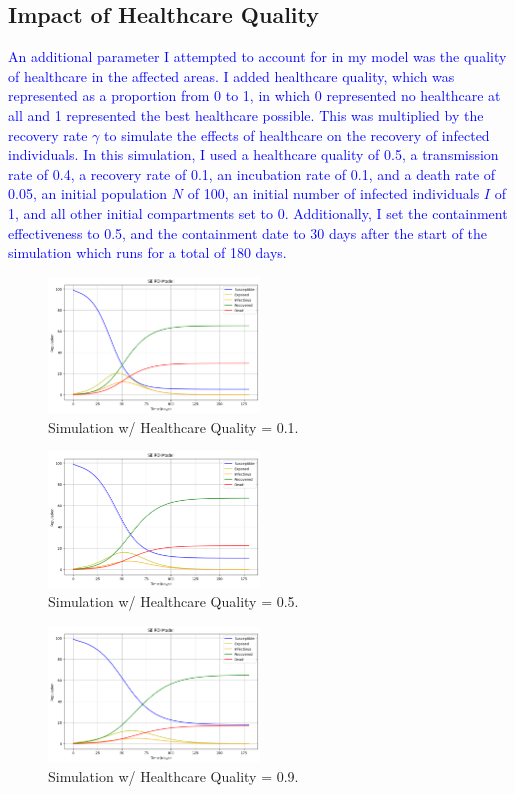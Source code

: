 \documentclass[%
 reprint,
superscriptaddress,
 amsmath,amssymb,
 aps,
floatfix,
]{revtex4-2}
\begin{document}
\subsection{Impact of Healthcare Quality}
\textcolor{blue}{
    An additional parameter I attempted to account for in my model was the quality of healthcare in the affected areas. 
    I added healthcare quality, which was represented as a proportion from 0 to 1, in which 0 represented no healthcare at all and 1 represented the best healthcare possible. 
    This was multiplied by the recovery rate $\gamma$ to simulate the effects of healthcare on the recovery of infected individuals.
    In this simulation, I used a 
    healthcare quality of 0.5, 
    a transmission rate of 0.4,
    a recovery rate of 0.1, 
    an incubation rate of 0.1, 
    and a death rate of 0.05, 
    an initial population $N$ of 100,
    an initial number of infected individuals $I$ of 1, 
    and all other initial compartments set to 0. 
    Additionally, I set the containment effectiveness to 0.5, 
    and the containment date to 30 days after the start of the simulation which runs for a total of 180 days. }
\begin{figure}[hbt!]
    \centering
    \includegraphics[width=0.5\textwidth]{HealthCareA.png}
    \caption{Simulation w/ Healthcare Quality = 0.1.}
    \label{HealthcareA}
\end{figure}
\begin{figure}[hbt!]
    \centering
    \includegraphics[width=0.5\textwidth]{HealthCareB.png}
    \caption{Simulation w/ Healthcare Quality = 0.5.}
    \label{HealthcareB}
\end{figure}
\begin{figure}[hbt!]
    \centering
    \includegraphics[width=0.5\textwidth]{HealthCareC.png}
    \caption{Simulation w/ Healthcare Quality = 0.9.}
    \label{HealthcareC}
\end{figure} \\
\end{document}

